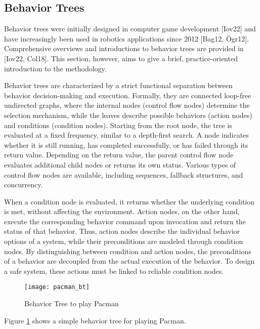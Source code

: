 \subsection{Behavior Trees}

Behavior trees were initially designed in computer game development [Iov22] and have increasingly been used in robotics applications since 2012 [Bag12, Ögr12].
Comprehensive overviews and introductions to behavior trees are provided in [Iov22, Col18].
This section, however, aims to give a brief, practice-oriented introduction to the methodology.

Behavior trees are characterized by a strict functional separation between behavior decision-making and execution.
Formally, they are connected loop-free undirected graphs, where the internal nodes (control flow nodes) determine the selection mechanism, while the leaves describe possible behaviors (action nodes) and conditions (condition nodes).
Starting from the root node, the tree is evaluated at a fixed frequency, similar to a depth-first search.
A node indicates whether it is still running, has completed successfully, or has failed through its return value.
Depending on the return value, the parent control flow node evaluates additional child nodes or returns its own status.
Various types of control flow nodes are available, including sequences, fallback structures, and concurrency.

When a condition node is evaluated, it returns whether the underlying condition is met, without affecting the environment.
Action nodes, on the other hand, execute the corresponding behavior command upon invocation and return the status of that behavior.
Thus, action nodes describe the individual behavior options of a system, while their preconditions are modeled through condition nodes.
By distinguishing between condition and action nodes, the preconditions of a behavior are decoupled from the actual execution of the behavior.
To design a safe system, these actions must be linked to reliable condition nodes.

\begin{figure}
  \centering
  \texttt{[image: pacman\_bt]}

  \caption{Behavior Tree to play Pacman}%
  \label{fig:pacman_bt}
\end{figure}

Figure \ref{fig:pacman_bt} shows a simple behavior tree for playing Pacman.

